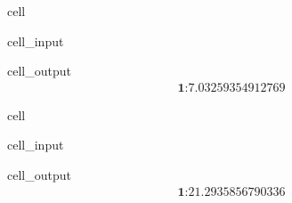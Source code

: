 \documentclass[letterpaper,10pt,english]{jupyterBook}
\begin{document}
\begin{sphinxuseclass}{cell}\begin{sphinxVerbatimInput}

\begin{sphinxuseclass}{cell_input}
\begin{sphinxVerbatim}[commandchars=\\\{\}]

\end{sphinxVerbatim}

\end{sphinxuseclass}\end{sphinxVerbatimInput}
\begin{sphinxVerbatimOutput}

\begin{sphinxuseclass}{cell_output}\begin{equation*}
\begin{split}\textbf{1:} 7.03259354912769\end{split}
\end{equation*}
\end{sphinxuseclass}\end{sphinxVerbatimOutput}

\end{sphinxuseclass}
\begin{sphinxuseclass}{cell}\begin{sphinxVerbatimInput}

\begin{sphinxuseclass}{cell_input}
\begin{sphinxVerbatim}[commandchars=\\\{\}]

\end{sphinxVerbatim}

\end{sphinxuseclass}\end{sphinxVerbatimInput}
\begin{sphinxVerbatimOutput}

\begin{sphinxuseclass}{cell_output}\begin{equation*}
\begin{split}\textbf{1:} 21.2935856790336\end{split}
\end{equation*}
\end{sphinxuseclass}\end{sphinxVerbatimOutput}

\end{sphinxuseclass}
\end{document}
